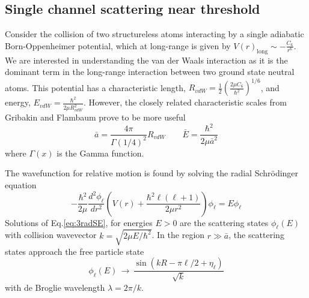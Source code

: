 \subsection{Single channel scattering near threshold} \label{ssec:low_energy}
Consider the collision of two structureless atoms interacting by a single adiabatic Born-Oppenheimer potential, which at long-range is given by $V(r)_{\text{long}} \sim -\frac{C_6}{r^6}$.
We are interested in understanding the van der Waals interaction as it is the dominant term in the long-range interaction between two ground state neutral atoms.
This potential has a characteristic length, $R_{vdW} = \frac{1}{2} \left(\frac{2 \mu C_6}{\hbar^2}\right)^{1/6}$, and energy, $E_{vdW}=\frac{\hbar^2}{2\mu R_{vdW}^2}$.
However, the closely related characteristic scales from Gribakin and Flambaum \cite{gfl93} prove to be more useful 
\begin{equation}
	\bar{a} = \frac{4 \pi}{\Gamma(1/4)^2}R_{vdW} \quad\quad \bar{E}=\frac{\hbar^2}{2\mu\bar{a}^2}
\end{equation}
where $\Gamma(x)$ is the Gamma function.

The wavefunction for relative motion is found by solving the radial Schr\"{o}dinger equation
\begin{equation} \label{eq:3radSE}
	-\frac{\hbar^2}{2 \mu}\frac{d^2 \phi_{\ell}}{dr^2} \left( V(r) + \frac{\hbar^2\ell(\ell+1)}{2\mu r^2} \right) \phi_{\ell}=E\phi_{\ell}
\end{equation}
Solutions of Eq.\ref{eq:3radSE}, for energies $E>0$ are the scattering states $\phi_{\ell}(E)$ with collision wavevector $k=\sqrt{2\mu E/\hbar^2}$.
In the region $r\gg\bar{a}$, the scattering states approach the free particle state
\begin{equation} \label{eq:3asymwf}
	\phi_{\ell}(E)\,\rightarrow\,\frac{\sin(kR-\pi\ell/2+\eta_{\ell})}{\sqrt{k}}
\end{equation}
with de Broglie wavelength $\lambda = 2\pi/k$.

